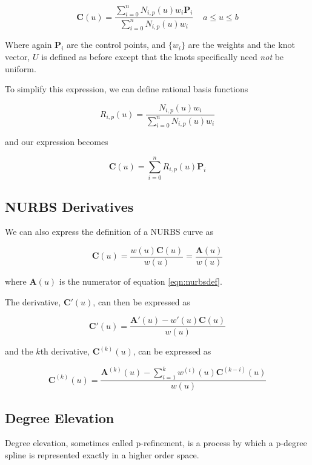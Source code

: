 \begin{equation}\label{eqn:nurbsdef} \textbf{C}(u) = \frac{ \displaystyle \sum^n_{i=0}N_{i,p}(u) w_i \textbf{P}_i }{ \displaystyle \sum^n_{i=0}N_{i,p}(u) w_i }~~~~~a\leq u \leq b \end{equation}  

Where again $\textbf{P}_i$ are the control points, and $\{w_i\}$ are the weights and the knot vector, $U$ is defined as before except that the knots specifically need \textit{not} be uniform.

To simplify this expression, we can define rational basis functions

\begin{equation} R_{i,p}(u) = \frac{ N_{i,p}(u) w_i } { \displaystyle \sum^n_{i=0}N_{i,p}(u) w_i }\end{equation}  

and our expression becomes

\begin{equation} \textbf{C}(u) = \sum^n_{i=0} R_{i,p}(u) \textbf{P}_i  \end{equation}  

\subsection{NURBS Derivatives}
We can also express the definition of a NURBS curve as

\begin{equation} \textbf{C}(u) = \frac{ w(u) \textbf{C}(u) }{ w(u) } = \frac{ \textbf{A}(u) }{ w(u) }   \end{equation}  

where $\textbf{A}(u) $ is the numerator of equation \ref{eqn:nurbsdef}.

The derivative, $\textbf{C}'(u)$, can then be expressed as

\begin{equation} \textbf{C}'(u) = \frac{ \textbf{A}'(u) - w'(u) \textbf{C}(u) }{ w(u) }   \end{equation}

and the $k$th derivative, $\textbf{C}^{ (k) }  (u)$, can be expressed as

\begin{equation} \textbf{C}^{(k)}(u) = \frac{ \textbf{A}^{(k)}(u) - \displaystyle \sum^k_{i=1} w^{(i)} (u) \textbf{C}^{(k-i)} (u) }{ w(u) }   \end{equation}

\subsection{Degree Elevation}
Degree elevation, sometimes called p-refinement, is a process by which a p-degree spline is represented exactly in a higher order space.

